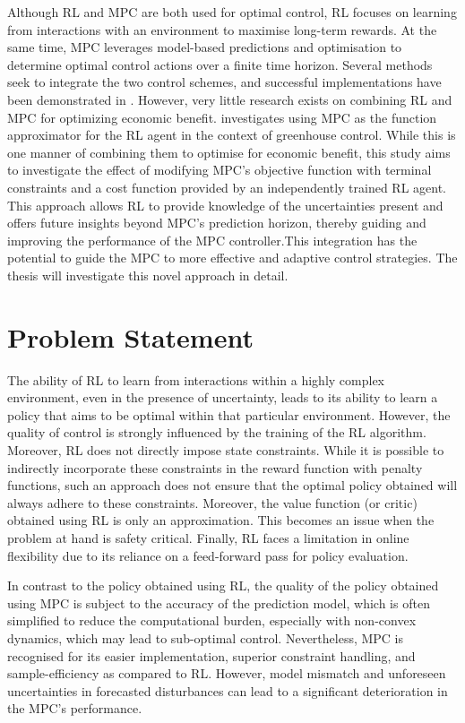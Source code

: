 Although  RL and MPC are both used for optimal control, RL focuses on learning from interactions with an environment to maximise long-term rewards. At the same time, MPC leverages model-based predictions and optimisation to determine optimal control actions over a finite time horizon. Several methods seek to integrate the two control schemes, and successful implementations have been demonstrated in \cite{lubbersAutonomousGreenhouseClimate2023, arroyoReinforcedModelPredictive2022, linReinforcementLearningBasedModel2023}. However, very little research exists on combining RL and MPC for optimizing economic benefit. \citet{lubbersAutonomousGreenhouseClimate2023} investigates using MPC as the function approximator for the RL agent in the context of greenhouse control. While this is one manner of combining them to optimise for economic benefit, this study aims to investigate the effect of modifying MPC's objective function with terminal constraints and a cost function provided by an independently trained RL agent. This approach allows RL to provide knowledge of the uncertainties present and offers future insights beyond MPC's prediction horizon, thereby guiding and improving the performance of the MPC controller.This integration has the potential to guide the MPC to more effective and adaptive control strategies. The thesis will investigate this novel approach in detail.

\section{Problem Statement}

The ability of RL to learn from interactions within a highly complex environment, even in the presence of uncertainty, leads to its ability to learn a policy that aims to be optimal within that particular environment. However, the quality of control is strongly influenced by the training of the RL algorithm. Moreover, RL does not directly impose state constraints. While it is possible to indirectly incorporate these constraints  in the reward function with penalty functions, such an approach does not ensure that the optimal policy obtained will always adhere to these constraints. Moreover, the value function (or critic) obtained using RL is only an approximation. This becomes an issue when the problem at hand is safety critical. Finally, RL faces a limitation in online flexibility due to its reliance on a feed-forward pass for policy evaluation.

In contrast to the policy obtained using RL, the quality of the policy obtained using MPC is subject to the accuracy of the prediction model, which is often simplified to reduce the computational burden, especially with non-convex dynamics, which may lead to sub-optimal control. Nevertheless, MPC is recognised for its easier implementation, superior constraint handling, and sample-efficiency as compared to RL. However, model mismatch and unforeseen uncertainties in forecasted disturbances can lead to a significant deterioration in the MPC's performance. 


